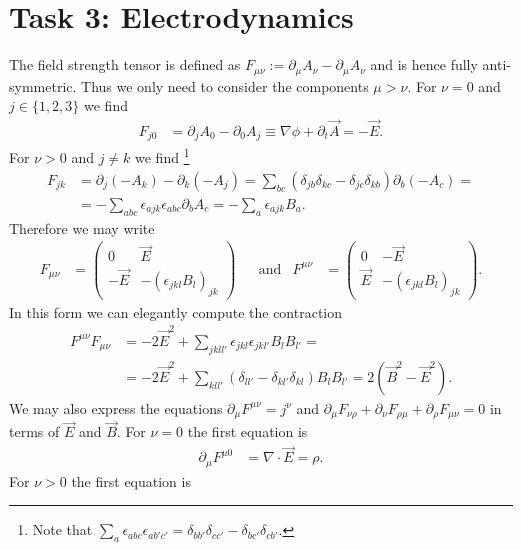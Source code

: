 \documentclass[english, parskip=full]{scrartcl}
\newcommand{\kla}{}
\newcommand{\tecxt}{}
\begin{document}
\section*{Task 3: Electrodynamics}
The field strength tensor is defined as $F_{\mu\nu} := \partial_\mu A_\nu - \partial_\mu A_\nu$ and is hence fully anti-symmetric.
Thus we only need to consider the components $\mu>\nu$.
For $\nu = 0$ and $j\in\{1,2,3\}$ we find
\begin{align}
F_{j 0} &= \partial_jA_0 - \partial_0 A_j \equiv \nabla \phi + \partial_t\vec{A} = -\vec{E}.
\end{align}
For $\nu > 0$ and $j\neq k$ we find \footnote{Note that $\sum_a\epsilon_{abc}\epsilon_{ab'c'} = \delta_{bb'}\delta_{cc'} - \delta_{bc'}\delta_{cb'}$.}
\begin{align}
F_{jk} &= \partial_j(-A_k) - \partial_k (-A_j) =  \sum_{bc} \kla\left( \delta_{jb}\delta_{kc} - \delta_{jc}\delta_{kb} \right)  \partial_{b} (-A_{c}) = \\
&= -\sum_{abc}\epsilon_{ajk}\epsilon_{abc} \partial_{b}A_{c} = -\sum_a \epsilon_{ajk} B_a.
\end{align}
Therefore we may write
\begin{align}
F_{\mu\nu} &= \begin{pmatrix}
0 & \vec{E} \\ -\vec{E} & -(\epsilon_{jkl}B_l)_{jk}
\end{pmatrix} &&\tecxt\text{and} & F^{\mu\nu} &= \begin{pmatrix}
0 & -\vec{E} \\ \vec{E} & -(\epsilon_{jkl}B_l)_{jk}
\end{pmatrix}.
\end{align}
In this form we can elegantly compute the contraction
\begin{align}
F^{\mu\nu}F_{\mu\nu} &= -2\vec{E}^2 + \sum_{jkll'}\epsilon_{jkl}\epsilon_{jkl'}B_lB_{l'} = \\
&= -2\vec{E}^2 + \sum_{kll'} \kla\left( \delta_{ll'} - \delta_{kl'}\delta_{kl} \right)B_lB_{l'} = 2\kla\left( \vec{B}^2 - \vec{E}^2 \right).
\end{align}
We may also express the equations $\partial_\mu F^{\mu\nu}=j^\nu$ and $\partial_\mu F_{\nu\rho} + \partial_\nu F_{\rho\mu} + \partial_\rho F_{\mu\nu} = 0$ in terms of $\vec{E}$ and $\vec{B}$.
For $\nu=0$ the first equation is
\begin{align}
\partial_\mu F^{\mu 0} &= \nabla \cdot \vec{E} = \rho.
\end{align}
For $\nu > 0$ the first equation is
\end{document}
